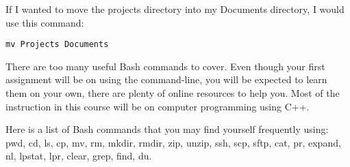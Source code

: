 \documentclass[a4paper,12pt]{article}
\begin{document}
If I wanted to move the projects directory into my Documents directory, I would use this command:
\begin{lstlisting}
mv Projects Documents
\end{lstlisting}

There are too many useful Bash commands to cover. Even though your first assignment will be on using the command-line, you will be expected to learn them on your own, there are plenty of online resources to help you. Most of the instruction in this course will be on computer programming using C++.

Here is a list of Bash commands that you may find yourself frequently using: pwd, cd, ls, cp, mv, rm, mkdir, rmdir, zip, unzip, ssh, scp, sftp, cat, pr, expand, nl, lpstat, lpr, clear, grep, find, du.
\end{document}
